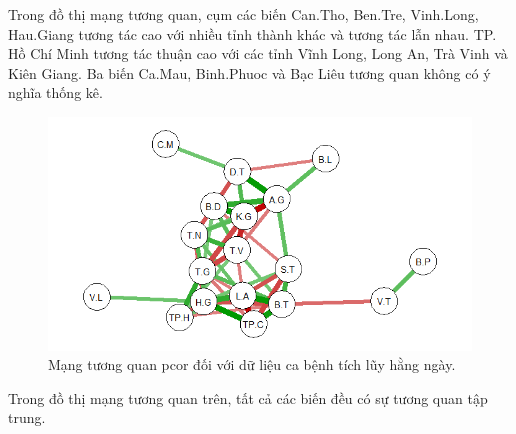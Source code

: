\documentclass[../thesis.tex]{subfiles}
\begin{document}
Trong đồ thị mạng tương quan, cụm các biến Can.Tho, Ben.Tre, Vinh.Long, Hau.Giang tương tác cao với nhiều tỉnh thành khác và tương tác lẫn nhau. TP. Hồ Chí Minh tương tác thuận cao với các tỉnh Vĩnh Long, Long An, Trà Vinh và Kiên Giang. Ba biến Ca.Mau, Binh.Phuoc và Bạc Liêu tương quan không có ý nghĩa thống kê. 

\begin{Shaded}
	\begin{Highlighting}[]
\OtherTok{\textless{}{-}}\SpecialCharTok{\%\textgreater{}\%} \NormalTok{() }\SpecialCharTok{\%\textgreater{}\%} 
\SpecialCharTok{::}
		 \NormalTok{, }
		 \NormalTok{, }
		 \NormalTok{,}
		 
		 \NormalTok{)}
	\end{Highlighting}
\end{Shaded}

\begin{figure}[H]
	\centering
	\includegraphics[width=0.7\linewidth]{images/net_cul_05}
	\caption[Mạng tương quan pcor đối với dữ liệu ca bệnh tích lũy hằng ngày]{Mạng tương quan pcor đối với dữ liệu ca bệnh tích lũy hằng ngày.}
	\label{fig:netcul05}
\end{figure}

Trong đồ thị mạng tương quan trên, tất cả các biến đều có sự tương quan tập trung. 
\end{document}

